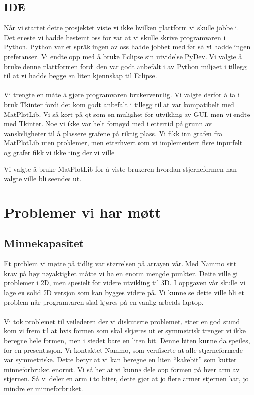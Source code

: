 \subsection{IDE}
Når vi startet dette prosjektet viste vi ikke hvilken plattform vi skulle jobbe i. Det eneste vi hadde bestemt oss for var at vi skulle skrive programvaren i Python. Python var et språk ingen av oss hadde jobbet med før så vi hadde ingen preferanser. Vi endte opp med å bruke Eclipse sin utvidelse PyDev. Vi valgte å bruke denne plattformen fordi den var godt anbefalt i av Python miljøet i tillegg til at vi hadde begge en liten kjennskap til Eclipse. \\ \\
Vi trengte en måte å gjøre programvaren brukervennlig. Vi valgte derfor å ta i bruk Tkinter fordi det kom godt anbefalt i tillegg til at var kompatibelt med MatPlotLib. Vi så kort på qt som en mulighet for utvikling av GUI, men vi endte med Tkinter. Noe vi ikke var helt fornøyd med i ettertid på grunn av vanskeligheter til å plassere grafene på riktig plass. Vi fikk inn grafen fra MatPlotLib uten problemer, men etterhvert som vi implementert flere inputfelt og grafer  fikk vi ikke ting der vi ville. 

Vi valgte å bruke MatPlotLib for å viste brukeren hvordan stjerneformen han valgte ville bli seendes ut. 
\section{Problemer vi har møtt}
\subsection{Minnekapasitet}
Et problem vi møtte på tidlig var størrelsen på arrayen vår. Med Nammo sitt krav på høy nøyaktighet måtte vi ha en enorm mengde punkter. Dette ville gi problemer i 2D, men spesielt for videre utvikling til 3D. I oppgaven vår skulle vi lage en solid 2D versjon som kan bygges videre på. Vi kunne se dette ville bli et problem når programvaren skal kjøres på en vanlig arbeids laptop.\\ \\
Vi tok problemet til veilederen der vi diskuterte problemet, etter en god stund kom vi frem til at hvis formen som skal skjæres ut er symmetrisk trenger vi ikke beregne hele formen, men i stedet bare en liten bit. Denne biten kunne da speiles, for en presentasjon. Vi kontaktet Nammo, som verifiserte at alle stjerneformede var symmetriske. Dette betyr at vi kan beregne en liten “kakebit” som kutter minneforbruket enormt. Vi så her at vi kunne dele opp formen på hver arm av stjernen. Så vi deler en arm i to biter, dette gjør at jo flere armer stjernen har, jo mindre er minneforbruket.



